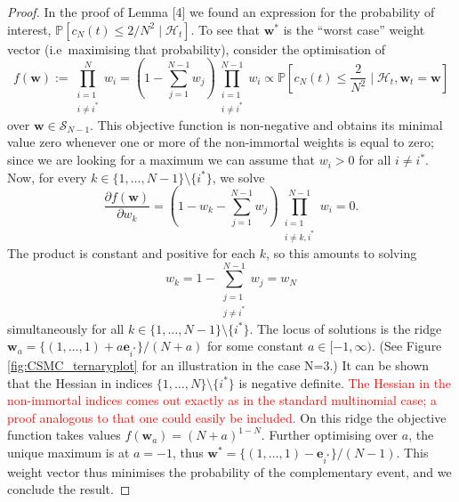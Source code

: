 \documentclass{article}
\newcommand{\seb}[1]{\xspace\textcolor{red}{#1}\xspace}
\newcommand{\PR}{\mathbb{P}}
\newcommand{\1}[1]{\mathbb{I}_{#1}}
\begin{document}
\begin{proof}
In the proof of Lemma [4] we found an expression for the probability of interest, $\PR[c_N(t) \leq 2/N^2 \mid \mathcal{H}_t]$.
To see that $\mathbf{w}^*$ is the ``worst case'' weight vector (i.e\ maximising that probability), consider the optimisation of
\begin{equation*}
f(\mathbf{w}) :=
\prod_{\substack{i=1\\ i\neq i^*}}^N w_i
= \left(1- \sum_{j=1}^{N-1} w_j \right)\prod_{\substack{i=1\\ i\neq i^*}}^{N-1} w_i 
\propto \PR \left[c_N(t) \leq \frac{2}{N^2} \mid \mathcal{H}_t, \mathbf{w}_t = \mathbf{w} \right]
\end{equation*}
over $\mathbf{w} \in \mathcal{S}_{N-1}$.
This objective function is non-negative and obtains its minimal value zero whenever one or more of the non-immortal weights is equal to zero; since we are looking for a maximum we can assume that $w_i >0$ for all $i \neq i^*$.
Now, for every $k \in \{1,\dots,N-1\}\setminus \{i^*\}$, we solve
\begin{equation*}
\frac{\partial f(\mathbf{w})}{\partial w_k}
= \left(1- w_k - \sum_{j=1}^{N-1} w_j \right)\prod_{\substack{i=1\\ i\neq k,i^*}}^{N-1} w_i 
=0 .
\end{equation*}
The product is constant and positive for each $k$, so this amounts to solving
\begin{equation*}
w_k = 1- \sum_{\substack{j=1\\ j\neq i^*}}^{N-1} w_j = w_N
\end{equation*}
simultaneously for all $k \in \{1,\dots,N-1\}\setminus \{i^*\}$.
The locus of solutions is the ridge
$\mathbf{w}_a = \{(1, \dots,1) +a \mathbf{e}_{i^*} \} /(N+a)$ for some constant $a \in [-1,\infty)$. (See Figure \ref{fig:CSMC_ternaryplot} for an illustration in the case N=3.)
It can be shown that the Hessian in indices $\{1,\dots,N\}\setminus \{i^*\}$ is negative definite.
\seb{The Hessian in the non-immortal indices comes out exactly as in the standard multinomial case; a proof analogous to that one could easily be included.}
On this ridge the objective function takes values $f(\mathbf{w}_a) = (N+a)^{1-N}$.
Further optimising over $a$, the unique maximum is at $a=-1$, thus $\mathbf{w}^* = \{(1,\dots,1) - \mathbf{e}_{i^*}\} /(N-1)$.
This weight vector thus minimises the probability of the complementary event, and we conclude the result.
\end{proof}
\end{document}
